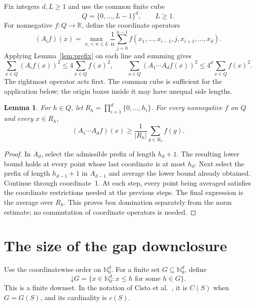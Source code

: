 \documentclass[11pt]{article}
\newtheorem{lemma}[theorem]{Lemma}
\theoremstyle{remark}
\newcommand{\N}{\mathbb N_0}
\newcommand{\R}{\mathbb R}
\begin{document}
Fix integers $d,L\ge1$ and use the common finite cube
\[
 Q=\{0,\ldots,L-1\}^d,\qquad L\ge1.
\]
For nonnegative $f:Q\to\R$, define the coordinate operators
\begin{equation}\label{eq:operator}
 (A_i f)(x)=\max_{x_i<n\le L}\frac1n
 \sum_{j=0}^{n-1}f(x_1,\ldots,x_{i-1},j,x_{i+1},\ldots,x_d).
\end{equation}
Applying Lemma~\ref{lem:prefix} on each line and summing gives
\begin{equation}\label{eq:tensor}
 \sum_{x\in Q}(A_i f(x))^2\le4\sum_{x\in Q}f(x)^2,
 \qquad
 \sum_{x\in Q}(A_1\cdots A_d f(x))^2\le4^d\sum_{x\in Q}f(x)^2.
\end{equation}
The rightmost operator acts first. The common cube is sufficient for the
application below; the origin boxes inside it may have unequal side lengths.

\begin{lemma}\label{lem:box}
For $h\in Q$, let $R_h=\prod_{i=1}^d\{0,\ldots,h_i\}$.
For every nonnegative $f$ on $Q$ and every $x\in R_h$,
\begin{equation}\label{eq:box}
 (A_1\cdots A_d f)(x)\ge\frac1{|R_h|}\sum_{y\in R_h}f(y).
\end{equation}
\end{lemma}
\begin{proof}
In $A_d$, select the admissible prefix of length $h_d+1$. The resulting
lower bound holds at every point whose last coordinate is at most $h_d$.
Next select the prefix of length $h_{d-1}+1$ in $A_{d-1}$ and average
the lower bound already obtained. Continue through coordinate~1. At each
step, every point being averaged satisfies the coordinate restrictions
needed at the previous steps. The final expression is the average over
$R_h$. This proves box domination separately from the norm estimate;
no commutation of coordinate operators is needed.
\end{proof}

\section{The size of the gap downclosure}
Use the coordinatewise order on $\N^d$. For a finite set $G\subseteq\N^d$,
define
\[
 \mathord\downarrow G=\{x\in\N^d:x\le h\text{ for some }h\in G\}.
\]
This is a finite downset. In the notation of Cisto et al.~\cite{CDF},
it is $C(S)$ when $G=G(S)$, and its cardinality is $c(S)$.
\end{document}

